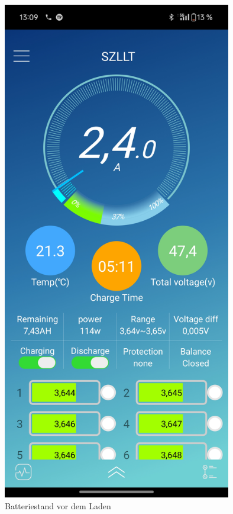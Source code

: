 \begin{figure}[h]
    \centering
    \includegraphics[width=10cm]{images/Batterie vor dem laden}
    \caption{Batteriestand vor dem Laden\cite{lorenz_scherrer_selbst_2023}}
    \label{fig:36}
\end{figure}

